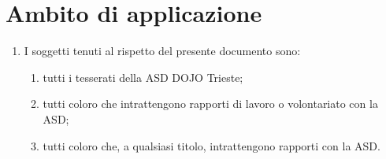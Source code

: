 \documentclass{djtsdoc}
\begin{document}
	\section{Ambito di applicazione}
	\begin{enumerate}
		\item I soggetti tenuti al rispetto del presente documento sono:
		\begin{enumerate}
			\item tutti i tesserati della ASD DOJO Trieste;
			\item tutti coloro che intrattengono rapporti di lavoro o volontariato con la ASD;
			\item tutti coloro che, a qualsiasi titolo, intrattengono rapporti con la ASD.
		\end{enumerate}
	\end{enumerate}
	
\end{document}

